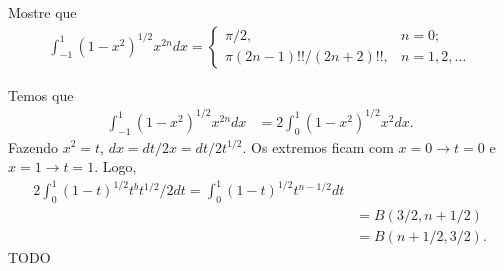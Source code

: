 \documentclass[a4paper,12pt, leqno, answers]{exam}
\begin{document}
\begin{questions}

    \question Mostre que
    \begin{align*}
        \int_{-1}^1 \left( 1 - x^2 \right)^{1/2} x^{2n} dx = \begin{cases}
            \pi / 2, & n = 0; \\
            \pi \left( 2n - 1 \right)!! / \left( 2n + 2 \right)!!, & n = 1, 2, \ldots
        \end{cases}
    \end{align*}
    \begin{solution}
        Temos que
        \begin{align*}
            \int_{-1}^1 (1 - x^2)^{1/2} x^{2n} dx &= 2 \int_0^1 (1 - x^2)^{1/2} x^2 dx.
        \end{align*}
        Fazendo $x^2 = t$, $dx = dt/2x = dt/2t^{1/2}$. Os extremos ficam com $x = 0 \to t = 0$ e $x = 1 \to t  = 1$. Logo,
        \begin{align*}
            2 \int_0^1 (1 - t)^{1/2} t^b t^{1/2} /2 dt = \int_0^1 (1 - t)^{1/2} t^{n - 1/2} dt \\
            &= B(3/2, n + 1/2) \\
            &= B(n + 1/2, 3/2).
        \end{align*}
        TODO
    \end{solution}


\end{questions}
\end{document}
